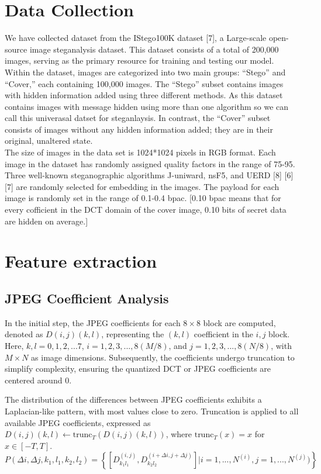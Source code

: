 \section{Data Collection} 
We have collected dataset from the IStego100K dataset [7], a Large-scale open-source image steganalysis dataset. This dataset consists of a total of 200,000 images, serving as the primary resource for training and testing our model. Within the dataset, images are categorized into two main groups: ``Stego'' and ``Cover,'' each containing 100,000 images. The ``Stego'' subset contains images with hidden information added using three different methods. As this dataset contains images with message hidden using more than one algorithm so we can call this univerasal datset for steganlaysis. In contrast, the ``Cover'' subset consists of images without any hidden information added; they are in their original, unaltered state.\\
The size of images in the data set is 1024*1024 pixels in RGB format. Each image in the dataset has randomly assigned quality factors in the range of 75-95. Three well-known steganographic algorithms J-uniward, nsF5, and UERD [8] [6] [7] are randomly selected for embedding in the images. The payload for each image is randomly set in the range of 0.1-0.4 bpac. [0.10 bpac means that for every  cofficient in the DCT domain of the cover image, 0.10 bits of secret data are hidden on average.]

\section{Feature extraction}

\subsection*{JPEG Coefficient Analysis}
In the initial step, the JPEG coefficients for each $8 \times 8$ block are computed, denoted as $D(i,j)(k,l)$, representing the $(k, l)$ coefficient in the $i, j$ block. Here, $k, l = 0, 1, 2, ...7$, $i = 1, 2, 3, ..., 8(M/8)$, and $j = 1, 2, 3, ..., 8(N/8)$, with $M \times N$ as image dimensions. Subsequently, the coefficients undergo truncation to simplify complexity, ensuring the quantized DCT or JPEG coefficients are centered around 0.

The distribution of the differences between JPEG coefficients exhibits a Laplacian-like pattern, with most values close to zero. Truncation is applied to all available JPEG coefficients, expressed as $D(i,j)(k,l) \leftarrow \text{trunc}_T(D(i,j)(k,l))$, where $\text{trunc}_T(x) = x$ for $x \in [-T, T]$.
\[
    P(\Delta i, \Delta j,k_1,l_1,k_2,l_2)=\left \{ \left [ D^{(i,j)}_{k_1l_1},D^{(i+\Delta i,j+\Delta j)}_{k_2l_2} \right ] \vert i=1,...,N^{(i)}, j=1,...,N^{(j)})\right \}
\]

